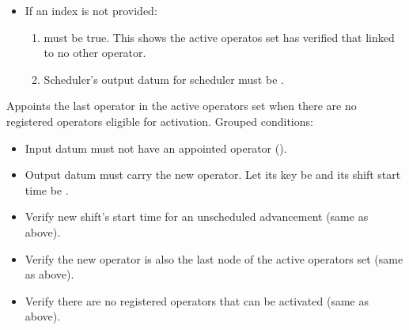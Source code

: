\documentclass[../midgard.tex]{subfiles}
\begin{document}
\begin{description}
\begin{itemize}
\begin{itemize}
            \item If an index is not provided:
              \begin{enumerate}[resume]
                \item {} must be true.
                  This shows the active operatos set has verified that  linked to no other operator.
                \item Scheduler's output datum for scheduler must be .
              \end{enumerate}
          \end{itemize}
      \end{itemize}
    \item[Appoint First Operator.] Appoints the last operator in the active operators set when there are no registered operators eligible for activation.
      Grouped conditions:
      \begin{itemize}
        \item Input datum must not have an appointed operator ().
        \item Output datum must carry the new operator.
          Let its key be  and its shift start time be .
        \item Verify new shift's start time for an unscheduled advancement (same as above).
        \item Verify the new operator is also the last node of the active operators set (same as above).
        \item Verify there are no registered operators that can be activated (same as above).
      \end{itemize}

\end{description}
\end{document}
